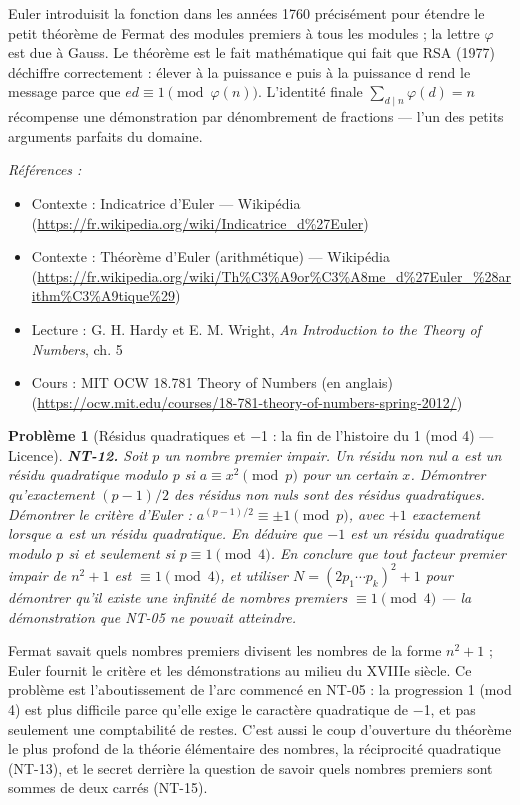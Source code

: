 \documentclass[11pt]{article}
\newtheorem{problem}{Problème}
\newenvironment{refs}{\par\small\noindent\emph{Références :}\begin{itemize}\setlength\itemsep{0pt}}{\end{itemize}\normalsize}
\begin{document}
\noindent Euler introduisit la fonction dans les années 1760 précisément pour étendre le
petit théorème de Fermat des modules premiers à tous les modules ; la lettre $\varphi$ est due à Gauss. Le
théorème est le fait mathématique qui fait que RSA (1977) déchiffre correctement : élever à la
puissance e puis à la puissance d rend le message parce que $ed \equiv 1 \pmod{\varphi(n)}$.
L'identité finale $\sum_{d\mid n}\varphi(d) = n$ récompense une démonstration par dénombrement de
fractions --- l'un des petits arguments parfaits du domaine.

\begin{refs}
\item Contexte : Indicatrice d'Euler --- Wikipédia (\url{https://fr.wikipedia.org/wiki/Indicatrice_d%27Euler})
\item Contexte : Théorème d'Euler (arithmétique) --- Wikipédia (\url{https://fr.wikipedia.org/wiki/Th%C3%A9or%C3%A8me_d%27Euler_%28arithm%C3%A9tique%29})
\item Lecture : G. H. Hardy et E. M. Wright, \textit{An Introduction to the Theory of Numbers}, ch. 5
\item Cours : MIT OCW 18.781 Theory of Numbers (en anglais) (\url{https://ocw.mit.edu/courses/18-781-theory-of-numbers-spring-2012/})
\end{refs}

\bigskip

\begin{problem}[{Résidus quadratiques et $-$1 : la fin de l'histoire du 1 (mod 4) --- Licence}]
\textbf{NT-12.} Soit $p$ un nombre premier impair. Un résidu non nul $a$
est un résidu quadratique modulo $p$ si $a \equiv x^2 \pmod p$ pour un certain $x$. Démontrer
qu'exactement $(p - 1)/2$ des résidus non nuls sont des résidus quadratiques. Démontrer le critère
d'Euler : $a^{(p-1)/2} \equiv \pm 1 \pmod p$, avec $+1$ exactement lorsque $a$ est un résidu
quadratique. En déduire que $-1$ est un résidu quadratique modulo $p$ si et seulement si
$p \equiv 1 \pmod 4$. En conclure que tout facteur premier impair de $n^2 + 1$ est
$\equiv 1 \pmod 4$, et utiliser $N = (2 p_1 \cdots p_k)^2 + 1$ pour démontrer qu'il existe une
infinité de nombres premiers $\equiv 1 \pmod 4$ --- la démonstration que NT-05 ne pouvait
atteindre.
\end{problem}

\noindent Fermat savait quels nombres premiers divisent les nombres de la forme
$n^2 + 1$ ; Euler fournit le critère et les démonstrations au milieu du XVIIIe siècle.
Ce problème est l'aboutissement de l'arc commencé en NT-05 : la progression 1 (mod 4) est plus
difficile parce qu'elle exige le caractère quadratique de $-$1, et pas seulement une comptabilité de
restes. C'est aussi le coup d'ouverture du théorème le plus profond de la théorie élémentaire des
nombres, la réciprocité quadratique (NT-13), et le secret derrière la question de savoir quels
nombres premiers sont sommes de deux carrés (NT-15).
\end{document}
